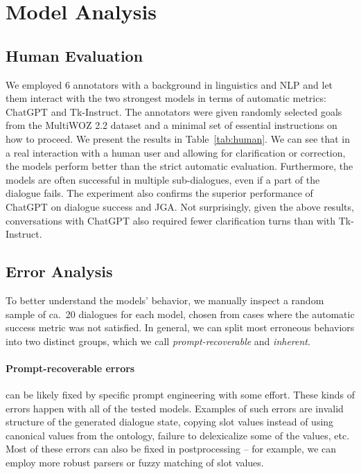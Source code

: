 \section{Model Analysis}
\label{07:sec:analysis}

\subsection{Human Evaluation}
\label{07:sec:human}
We employed 6 annotators with a background in linguistics and NLP and let them interact with the two strongest models in terms of automatic metrics: ChatGPT and Tk-Instruct.
The annotators were given randomly selected goals from the MultiWOZ 2.2 dataset and a minimal set of essential instructions on how to proceed.
We present the results in Table~\ref{tab:human}.
We can see that in a real interaction with a human user and allowing for clarification or correction, the models perform better than the strict automatic evaluation.
Furthermore, the models are often successful in multiple sub-dialogues, even if a part of the dialogue fails.
The experiment also confirms the superior performance of ChatGPT on dialogue success and JGA.
Not surprisingly, given the above results, conversations with ChatGPT also required fewer clarification turns than with Tk-Instruct.

\subsection{Error Analysis}

To better understand the models' behavior, we manually inspect a random sample of ca.~20 dialogues for each model, chosen from cases where the automatic success metric was not satisfied. 
In general, we can split most erroneous behaviors into two distinct groups, which we call \emph{prompt-recoverable} and \emph{inherent}.

\paragraph{Prompt-recoverable errors} can be likely fixed by specific prompt engineering with some effort.
These kinds of errors happen with all of the tested models.
Examples of such errors are invalid structure of the generated dialogue state, copying slot values instead of using canonical values from the ontology, failure to delexicalize some of the values, etc.
Most of these errors can also be fixed in postprocessing -- for example, we can employ more robust parsers or fuzzy matching of slot values.

